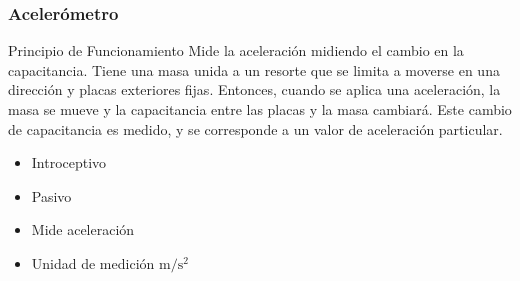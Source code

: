 \begin{frame}
    \frametitle{Acelerómetro}
    
    \begin{figure}[!h]
        \hspace{1em}
        \hspace{1em}
    \end{figure}
    \scriptsize
    \begin{block}{Principio de Funcionamiento}
        Mide la aceleración midiendo el cambio en la capacitancia. Tiene una masa unida a un resorte que se limita a moverse en una dirección y placas exteriores fijas. Entonces, cuando se aplica una aceleración, la masa se mueve y la capacitancia entre las placas y la masa cambiará. Este cambio de capacitancia es medido, y se corresponde a un valor de aceleración particular.
    \end{block}
    
    
    \begin{itemize}
        \item Introceptivo
        \item Pasivo
        \item Mide aceleración
        \item Unidad de medición $\si{\meter\per\square\second}$
    \end{itemize}
    
\end{frame}

